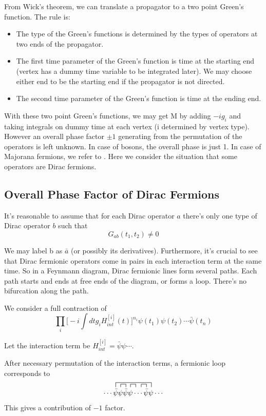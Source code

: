 \documentclass[12pt]{book}
\begin{document}
	From Wick's theorem, we can translate a propagator to a two point Green's function. The rule is: 
	\begin{itemize}
		\item The type of the Green's functions is determined by the types of operators at two ends of the propagator.
		\item The first time parameter of the Green's function is time at the starting end (vertex has a dummy time variable to be integrated later). We may choose either end to be the starting end if the propagator is not directed.
		\item The second time  parameter of the Green's function is time at the ending end.
	\end{itemize}
	With these two point Green's functions, we may get M by adding $-ig_i$ and taking integrals on dummy time at each vertex (i determined by vertex type). However an overall phase factor $\pm 1$ generating from the permutation of the operators is left unknown. In case of bosons, the overall phase is just 1. In case of Majorana fermions, we refer to \cite{Majorana_rule}. Here we consider the situation that some operators are Dirac fermions. 	
	\subsection{Overall Phase Factor of Dirac Fermions}
	It's reasonable to assume that for each Dirac operator $a$ there's only one type of Dirac operator $b$ such that
	\begin{equation}
		G_{ab}(t_1,t_2)\neq0
	\end{equation}
	
	We may label b as $\bar{a}$ (or possibly its derivatives). Furthermore, it's crucial to see that Dirac fermionic operators come in pairs in each interaction term at the same time. So in a Feynmann diagram,  Dirac fermionic lines form several paths. Each path starts and ends at free ends of the diagram, or forms a loop. There's no bifurcation along the path.
	
	We consider a full contraction of
	\begin{equation}
		\prod_i\Big[-i\int dt g_iH_{int}^{[i]}(t)\Big]^{n_i}\psi(t_1)\psi(t_2)\cdots \bar\psi(t_n)
	\end{equation}
	
	Let the interaction term be $H_{int}^{[i]}=\bar\psi\psi\cdots$. 
	
	After necessary permutation of the interaction terms, a fermionic loop corresponds to
	\begin{equation}
		\contraction[1.5ex]{\cdots}{\bar\psi}{\psi\bar\psi\psi\cdots\bar\psi}{\psi}
		\contraction[1ex]{\cdots\bar\psi}{\bar\psi}{}{\bar\psi}
		\contraction[1ex]{\cdots\bar\psi\psi\bar\psi}{\bar\psi}{}{\psi}
		\contraction[1ex]{\cdots\bar\psi\psi\bar\psi\quad\,\,\,}{\bar\psi}{}{\bar\psi}
		\cdots\bar\psi\psi\bar\psi\psi\cdots\bar\psi\psi\cdots
	\end{equation}
	This gives a contribution of $-1$ factor.
	
\end{document}
